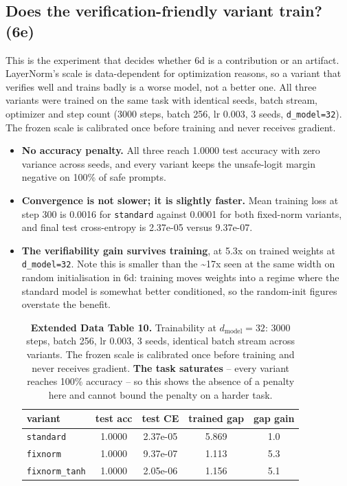 \documentclass[sn-nature,pdflatex]{sn-jnl}
\begin{document}
\subsection{Does the verification-friendly variant train? (6e)}
This is the experiment that decides whether 6d is a contribution or an artifact. LayerNorm's scale is data-dependent for optimization reasons, so a variant that verifies well and trains badly is a worse model, not a better one. All three variants were trained on the same task with identical seeds, batch stream, optimizer and step count (3000 steps, batch 256, lr 0.003, 3 seeds, \texttt{d\_model=32}). The frozen scale is calibrated once before training and never receives gradient.
\begin{itemize}
\item \textbf{No accuracy penalty.} All three reach 1.0000 test accuracy with zero variance across seeds, and every variant keeps the unsafe-logit margin negative on 100\% of safe prompts.
\item \textbf{Convergence is not slower; it is slightly faster.} Mean training loss at step 300 is 0.0016 for \texttt{standard} against 0.0001 for both fixed-norm variants, and final test cross-entropy is 2.37e-05 versus 9.37e-07.
\item \textbf{The verifiability gain survives training}, at 5.3x on trained weights at \texttt{d\_model=32}. Note this is smaller than the \textasciitilde{}17x seen at the same width on random initialisation in 6d: training moves weights into a regime where the standard model is somewhat better conditioned, so the random-init figures overstate the benefit.

\begin{table}[t]
\centering
\caption*{\textbf{Extended Data Table 10.} Trainability at $d_{\text{model}}=32$: 3000 steps, batch 256, lr 0.003, 3 seeds, identical batch stream across variants. The frozen scale is calibrated once before training and never receives gradient. \textbf{The task saturates} -- every variant reaches 100\% accuracy -- so this shows the absence of a penalty here and cannot bound the penalty on a harder task.}
\label{edtab:trainability}
\begin{tabular}{l S[table-format=1.4] S[table-format=1.2e2] S[table-format=1.3] S[table-format=2.1]}
\toprule
variant & {test acc} & {test CE} & {trained gap} & {gap gain} \\
\midrule
\texttt{standard} & 1.0000 & 2.37e-05 & 5.869 & 1.0 \\
\texttt{fixnorm} & 1.0000 & 9.37e-07 & 1.113 & 5.3 \\
\texttt{fixnorm\_tanh} & 1.0000 & 2.05e-06 & 1.156 & 5.1 \\
\bottomrule
\end{tabular}
\end{table}

\end{itemize}
\end{document}
